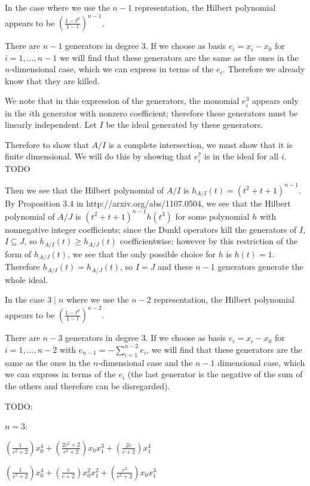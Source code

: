 \documentclass{article}
\numberwithin{equation}{section}
\begin{document}
In the case where we use the $n-1$ representation, the Hilbert polynomial appears to be $\left(\frac{1-t^p}{1-t}\right)^{n-1}$.

There are $n-1$ generators in degree $3$. If we choose as basis $e_i=x_i-x_0$ for $i=1,\dots,n-1$ we will find that these generators are the same as the ones in the $n$-dimensional case, which we can express in terms of the $e_i$. Therefore we already know that they are killed.

We note that in this expression of the generators, the monomial $e_i^3$ appears only in the $i$th generator with nonzero coefficient; therefore these generators must be linearly independent. Let $I$ be the ideal generated by these generators. 

Therefore to show that $A/I$ is a complete intersection, we must show that it is finite dimensional. We will do this by showing that $e_i^7$ is in the ideal for all $i$. TODO

Then we see that the Hilbert polynomial of $A/I$ is $h_{A/I}(t)=(t^2+t+1)^{n-1}$. By Proposition 3.4 in http://arxiv.org/abs/1107.0504, we see that the Hilbert polynomial of $A/J$ is $(t^2+t+1)^{n-1}h(t^3)$ for some polynomial $h$ with nonnegative integer coefficients; since the Dunkl operators kill the generators of $I$, $I \subseteq J$, so $h_{A/I}(t) \ge h_{A/J}(t)$ coefficientwise; however by this restriction of the form of $h_{A/J}(t)$, we see that the only possible choice for $h$ is $h(t)=1$. Therefore $h_{A/I}(t)=h_{A/J}(t)$, so $I=J$ and these $n-1$ generators generate the whole ideal.

In the case $3 \mid n$ where we use the $n-2$ representation, the Hilbert polynomial appears to be $\left(\frac{1-t^p}{1-t}\right)^{n-2}$.

There are $n-3$ generators in degree $3$. If we choose as basis $e_i=x_i-x_0$ for $i=1,\dots,n-2$ with $e_{n-1}=-\sum_{i=1}^{n-2}e_i$, we will find that these generators are the same as the ones in the $n$-dimensional case and the $n-1$ dimensional case, which we can express in terms of the $e_i$ (the last generator is the negative of the sum of the others and therefore can be disregarded). 



TODO:

$n=3$:

$(\frac{1}{c^{2} + 2}) x_{0}^{4} + (\frac{2 c^{2} + 2}{c^{2} + 2})
x_{0} x_{1}^{3} + (\frac{2 c}{c + 2}) x_{1}^{4}$    

$(\frac{1}{c^{2} + 2})
x_{0}^{4} + (\frac{c}{c + 2}) x_{0}^{2} x_{1}^{2} + (\frac{c^{2}}{c^{2}
+ 2}) x_{0} x_{1}^{3}$
\end{document}
